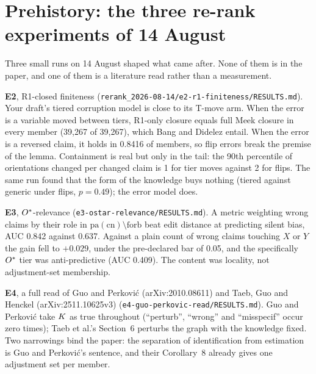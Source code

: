 \begin{antes}
\end{antes}

\section{Prehistory: the three re-rank experiments of 14 August}

Three small runs on 14 August shaped what came after. None of them is in the paper, and one of them
is a literature read rather than a measurement.

\textbf{E2}, R1-closed finiteness (\texttt{rerank\_2026-08-14/e2-r1-finiteness/RESULTS.md}). Your
draft's tiered corruption model is close to its T-move arm. When the error is a variable moved
between tiers, R1-only closure equals full Meek closure in every member (39,267 of 39,267), which
Bang and Didelez entail. When the
error is a reversed claim, it holds in 0.8416 of members, so flip errors break the premise of the
lemma. Containment is real but only in the tail: the 90th percentile of orientations changed per changed
claim is 1 for tier moves against 2 for flips. The same run found that the form of the knowledge buys nothing (tiered
against generic under flips, $p = 0.49$); the error model does.

\textbf{E3}, $O^{*}$-relevance (\texttt{e3-ostar-relevance/RESULTS.md}). A metric weighting wrong
claims by their role in $\mathrm{pa}(\mathrm{cn})\setminus\mathrm{forb}$ beat edit distance at predicting silent bias, AUC
0.842 against 0.637. Against a plain count of wrong claims touching $X$ or $Y$ the gain fell to
$+0.029$, under the pre-declared bar of 0.05, and the specifically $O^{*}$ tier was anti-predictive
(AUC 0.409). The content was locality, not adjustment-set membership.

\textbf{E4}, a full read of Guo and Perkovi\'c (arXiv:\allowbreak{}2010.08611) and Taeb, Guo and Henckel
(arXiv:\allowbreak{}2511.10625v3) (\texttt{e4-guo-perkovic-read/\allowbreak{}RESULTS.md}). Guo and Perkovi\'c take $K$ as
true throughout (``perturb'', ``wrong'' and ``misspecif'' occur zero times); Taeb et al.'s
Section~6 perturbs the graph with the knowledge fixed. Two narrowings bind the paper: the separation
of identification from estimation is Guo and Perkovi\'c's sentence, and their Corollary~8 already
gives one adjustment set per member.

